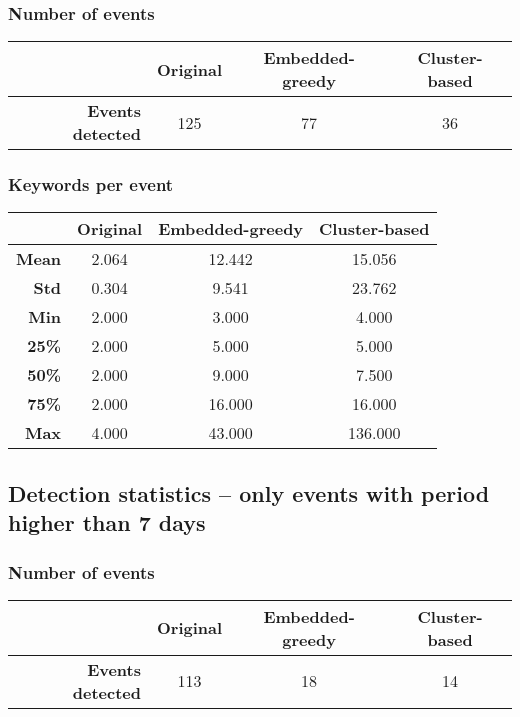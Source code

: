 \documentclass[a4paper]{article}
\begin{document}
\subsubsection{Number of events}
\begin{center}
\begin{tabular}{r c c c} \toprule[1.5pt]
& \bf Original & \bf Embedded-greedy & \bf Cluster-based \\ \midrule
\bf Events detected & 125 & 77 & 36 \\ \bottomrule[1.25pt]
\end{tabular}
\end{center}


\subsubsection{Keywords per event}
\begin{center}
\begin{tabular}{r c c c} \toprule[1.5pt]
& \bf Original & \bf Embedded-greedy & \bf Cluster-based \\ \midrule
\bf Mean & 2.064 & 12.442 & 15.056 \\
\bf Std	& 0.304 & 9.541 & 23.762 \\
\bf Min	& 2.000	& 3.000 & 4.000 \\
\bf 25\% & 2.000 & 5.000 & 5.000 \\
\bf 50\% & 2.000 & 9.000 & 7.500 \\
\bf 75\% & 2.000 & 16.000 & 16.000 \\
\bf Max	& 4.000 & 43.000 & 136.000 \\ \bottomrule[1.25pt]
\end{tabular}
\end{center}


\subsection{Detection statistics -- only events with period higher than 7 days}

\subsubsection{Number of events}
\begin{center}
\begin{tabular}{r c c c} \toprule[1.5pt]
& \bf Original & \bf Embedded-greedy & \bf Cluster-based \\ \midrule
\bf Events detected & 113 & 18 & 14 \\ \bottomrule[1.25pt]
\end{tabular}
\end{center}
\end{document}
